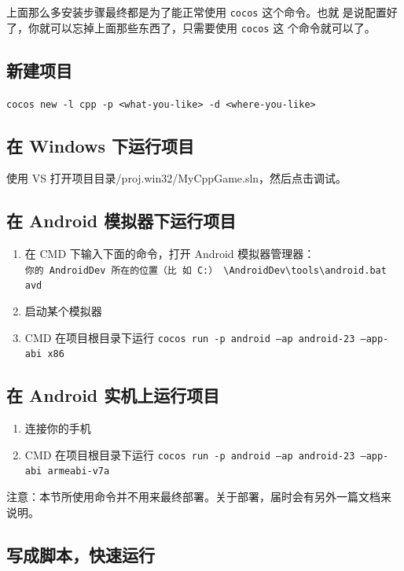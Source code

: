 \documentclass[a4paper, 10pt]{article}
\newcommand{\inlinecode}[1]{\colorbox{inlinecodecolor}{\texttt{#1}}}
\begin{document}
上面那么多安装步骤最终都是为了能正常使用 \texttt{cocos} 这个命令。也就
是说配置好了，你就可以忘掉上面那些东西了，只需要使用 \texttt{cocos} 这
个命令就可以了。

\subsection{新建项目}

\inlinecode{cocos new -l cpp -p <what-you-like> -d <where-you-like>}

\subsection{在 Windows 下运行项目}

使用 VS 打开项目目录/proj.win32/MyCppGame.sln，然后点击调试。

\subsection{在 Android 模拟器下运行项目}

\begin{enumerate}
\item 在 CMD 下输入下面的命令，打开 Android 模拟器管理器： \\
  \inlinecode{你的 AndroidDev 所在的位置（比
    如 C:）
    \textbackslash{}AndroidDev\textbackslash{}tools\textbackslash{}android.bat
    avd}
\item 启动某个模拟器
\item CMD 在项目根目录下运行 \inlinecode{cocos run -p android --ap
    android-23 --app-abi x86}
\end{enumerate}

\subsection{在 Android 实机上运行项目}

\begin{enumerate}
\item 连接你的手机
\item CMD 在项目根目录下运行 \inlinecode{cocos run -p android --ap
    android-23 --app-abi armeabi-v7a}
\end{enumerate}

注意：本节所使用命令并不用来最终部署。关于部署，届时会有另外一篇文档来
说明。

\subsection{写成脚本，快速运行}
\end{document}
